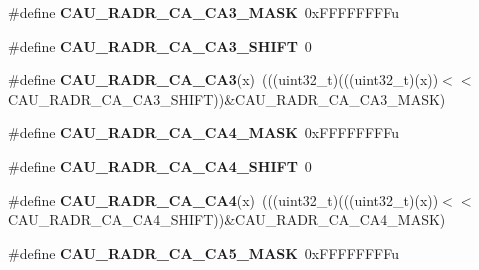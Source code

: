 \begin{DoxyCompactItemize}
\item 
\#define {\bfseries C\+A\+U\+\_\+\+R\+A\+D\+R\+\_\+\+C\+A\+\_\+\+C\+A3\+\_\+\+M\+A\+SK}~0x\+F\+F\+F\+F\+F\+F\+F\+Fu\hypertarget{group__CAU__Register__Masks_ga954f8fa4bd147e796210d7d13b423765}{}\label{group__CAU__Register__Masks_ga954f8fa4bd147e796210d7d13b423765}

\item 
\#define {\bfseries C\+A\+U\+\_\+\+R\+A\+D\+R\+\_\+\+C\+A\+\_\+\+C\+A3\+\_\+\+S\+H\+I\+FT}~0\hypertarget{group__CAU__Register__Masks_ga63b462a741709ed694a6bb20912783e4}{}\label{group__CAU__Register__Masks_ga63b462a741709ed694a6bb20912783e4}

\item 
\#define {\bfseries C\+A\+U\+\_\+\+R\+A\+D\+R\+\_\+\+C\+A\+\_\+\+C\+A3}(x)~(((uint32\+\_\+t)(((uint32\+\_\+t)(x))$<$$<$C\+A\+U\+\_\+\+R\+A\+D\+R\+\_\+\+C\+A\+\_\+\+C\+A3\+\_\+\+S\+H\+I\+FT))\&C\+A\+U\+\_\+\+R\+A\+D\+R\+\_\+\+C\+A\+\_\+\+C\+A3\+\_\+\+M\+A\+SK)\hypertarget{group__CAU__Register__Masks_gaa8819ee05a7fdbb53bee279104bf7d33}{}\label{group__CAU__Register__Masks_gaa8819ee05a7fdbb53bee279104bf7d33}

\item 
\#define {\bfseries C\+A\+U\+\_\+\+R\+A\+D\+R\+\_\+\+C\+A\+\_\+\+C\+A4\+\_\+\+M\+A\+SK}~0x\+F\+F\+F\+F\+F\+F\+F\+Fu\hypertarget{group__CAU__Register__Masks_ga9d0f7744ac9647b00fd84c95c76e763b}{}\label{group__CAU__Register__Masks_ga9d0f7744ac9647b00fd84c95c76e763b}

\item 
\#define {\bfseries C\+A\+U\+\_\+\+R\+A\+D\+R\+\_\+\+C\+A\+\_\+\+C\+A4\+\_\+\+S\+H\+I\+FT}~0\hypertarget{group__CAU__Register__Masks_gaeb4fe1e9be3bcb2b1ac74660b92e9a4b}{}\label{group__CAU__Register__Masks_gaeb4fe1e9be3bcb2b1ac74660b92e9a4b}

\item 
\#define {\bfseries C\+A\+U\+\_\+\+R\+A\+D\+R\+\_\+\+C\+A\+\_\+\+C\+A4}(x)~(((uint32\+\_\+t)(((uint32\+\_\+t)(x))$<$$<$C\+A\+U\+\_\+\+R\+A\+D\+R\+\_\+\+C\+A\+\_\+\+C\+A4\+\_\+\+S\+H\+I\+FT))\&C\+A\+U\+\_\+\+R\+A\+D\+R\+\_\+\+C\+A\+\_\+\+C\+A4\+\_\+\+M\+A\+SK)\hypertarget{group__CAU__Register__Masks_ga20080f8c8199450d8260df2db339e74c}{}\label{group__CAU__Register__Masks_ga20080f8c8199450d8260df2db339e74c}

\item 
\#define {\bfseries C\+A\+U\+\_\+\+R\+A\+D\+R\+\_\+\+C\+A\+\_\+\+C\+A5\+\_\+\+M\+A\+SK}~0x\+F\+F\+F\+F\+F\+F\+F\+Fu\hypertarget{group__CAU__Register__Masks_ga042e25609d552ff6fab834eb7ef16ace}{}\label{group__CAU__Register__Masks_ga042e25609d552ff6fab834eb7ef16ace}


\end{DoxyCompactItemize}
